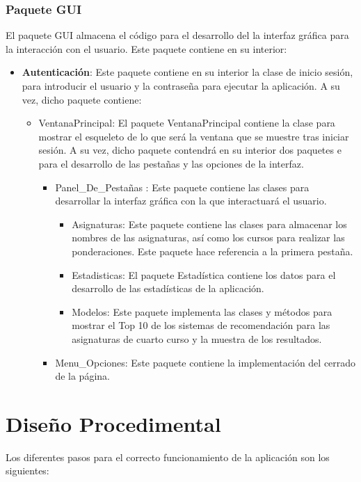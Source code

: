 \subsubsection{Paquete GUI}
El paquete GUI almacena el código para el desarrollo del la interfaz gráfica para la interacción con el usuario. Este paquete contiene en su interior: 
\begin{itemize}
\item \textbf{Autenticación}: Este paquete contiene en su interior la clase de inicio sesión, para introducir el usuario y la contraseña para ejecutar la aplicación. A su vez, dicho paquete contiene: 
\begin{itemize}
\item VentanaPrincipal: El paquete VentanaPrincipal contiene la clase para mostrar el esqueleto de lo que será la ventana que se muestre tras iniciar sesión. A su vez, dicho paquete contendrá en su interior dos paquetes e para el desarrollo de  las pestañas y las opciones de la interfaz. 
\begin{itemize}
\item Panel\_De\_Pestañas : Este paquete contiene las clases para desarrollar la interfaz gráfica con la que interactuará el usuario. 
\begin{itemize}
\item Asignaturas: Este paquete contiene las clases para almacenar los nombres de las asignaturas, así como los cursos para realizar las ponderaciones. Este paquete hace referencia a la primera pestaña.   
\item Estadisticas: El paquete Estadística contiene los datos para el desarrollo de las estadísticas de la aplicación. 
\item Modelos: Este paquete implementa las clases y métodos para mostrar el Top 10 de los sistemas de recomendación para las asignaturas de cuarto curso y la muestra de los resultados. 
\end{itemize}

\item Menu\_Opciones: Este paquete contiene la implementación del cerrado de la página. 
\end{itemize}
\end{itemize}
\end{itemize}
\section{Diseño Procedimental}
Los diferentes pasos para el correcto funcionamiento de la aplicación son los siguientes: 
